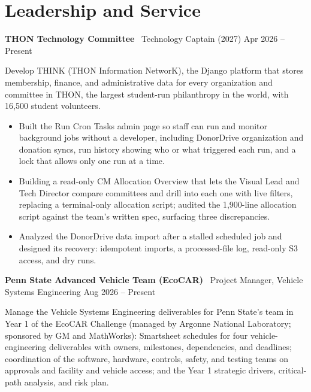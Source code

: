 \documentclass[11pt,a4paper]{article}
\begin{document}
\section*{Leadership and Service}

\textbf{THON Technology Committee} \
Technology Captain (2027) \hfill Apr 2026 -- Present

Develop THINK (THON Information NetworK), the Django platform that stores membership, finance, and administrative data for every organization and committee in THON, the largest student-run philanthropy in the world, with 16,500 student volunteers.

\begin{itemize}[leftmargin=1.5em]

\item Built the Run Cron Tasks admin page so staff can run and monitor background jobs without a developer, including DonorDrive organization and donation syncs, run history showing who or what triggered each run, and a lock that allows only one run at a time.

\item Building a read-only CM Allocation Overview that lets the Visual Lead and Tech Director compare committees and drill into each one with live filters, replacing a terminal-only allocation script; audited the 1,900-line allocation script against the team's written spec, surfacing three discrepancies.

\item Analyzed the DonorDrive data import after a stalled scheduled job and designed its recovery: idempotent imports, a processed-file log, read-only S3 access, and dry runs.

\end{itemize}

\vspace{0.4em}

\textbf{Penn State Advanced Vehicle Team (EcoCAR)} \
Project Manager, Vehicle Systems Engineering \hfill Aug 2026 -- Present

Manage the Vehicle Systems Engineering deliverables for Penn State's team in Year 1 of the EcoCAR Challenge (managed by Argonne National Laboratory; sponsored by GM and MathWorks): Smartsheet schedules for four vehicle-engineering deliverables with owners, milestones, dependencies, and deadlines; coordination of the software, hardware, controls, safety, and testing teams on approvals and facility and vehicle access; and the Year 1 strategic drivers, critical-path analysis, and risk plan.
\end{document}
